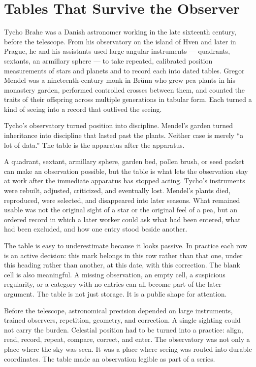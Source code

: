 \section{Tables That Survive the Observer}

Tycho Brahe was a Danish astronomer working in the late sixteenth century,
before the telescope. From his observatory on the island of Hven and later
in Prague, he and his assistants used large angular instruments --- quadrants,
sextants, an armillary sphere --- to take repeated, calibrated position
measurements of stars and planets and to record each into dated tables.
Gregor Mendel was a nineteenth-century monk in Brünn who grew pea plants in
his monastery garden, performed controlled crosses between them, and
counted the traits of their offspring across multiple generations in
tabular form. Each turned a kind of seeing into a record that outlived the
seeing.

Tycho's observatory turned position into discipline. Mendel's garden turned
inheritance into discipline that lasted past the plants. Neither case is
merely ``a lot of data.'' The table is the apparatus after the apparatus.

A quadrant, sextant, armillary sphere, garden bed, pollen brush, or seed
packet can make an observation possible, but the table is what lets the
observation stay at work after the immediate apparatus has stopped acting.
Tycho's instruments were rebuilt, adjusted, criticized, and eventually
lost. Mendel's plants died, reproduced, were selected, and
disappeared into later seasons. What remained usable was not the original
sight of a star or the original feel of a pea, but an ordered record in
which a later worker could ask what had been entered, what had been
excluded, and how one entry stood beside another.

The table is easy to underestimate because it looks passive. In practice
each row is an active decision: this mark belongs in this row rather than
that one, under this heading rather than another, at this date, with this
correction. The blank cell is also meaningful. A missing observation, an
empty cell, a suspicious regularity, or a category with no entries can all
become part of the later argument. The table is not just storage. It is a
public shape for attention.

Before the telescope, astronomical precision depended on large instruments,
trained observers, repetition, geometry, and correction. A single sighting
could not carry the burden. Celestial position had to be turned into a
practice: align, read, record, repeat, compare, correct, and enter. The
observatory was not only a place where the sky was seen. It was a place
where seeing was routed into durable coordinates. The table made an
observation legible as part of a series.


